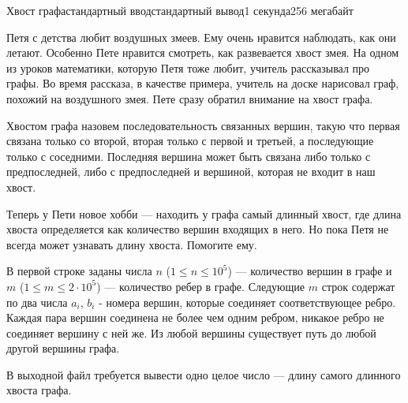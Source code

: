 \begin{problem}{Хвост графа}{стандартный ввод}{стандартный вывод}{1 секунда}{256 мегабайт}

Петя с детства любит воздушных змеев. Ему очень нравится наблюдать, как они летают. Особенно Пете нравится смотреть, как развевается хвост змея. На одном из уроков математики, которую Петя тоже любит, учитель рассказывал про графы. Во время рассказа, в качестве примера, учитель на доске нарисовал граф, похожий на воздушного змея. Пете сразу обратил внимание на хвост графа.

Хвостом графа назовем последовательность связанных вершин, такую что первая связана только со второй, вторая только с первой и третьей, а последующие только с соседними. Последняя вершина может быть связана либо только с предпоследней, либо с предпоследней и вершиной, которая не входит в наш хвост.

Теперь у Пети новое хобби --- находить у графа самый длинный хвост, где длина хвоста определяется как количество вершин входящих в него. Но пока Петя не всегда может узнавать длину хвоста. Помогите ему. 

\InputFile
В первой строке заданы числа $n$ ($1 \le n \le 10^5$) --- количество вершин в графе и $m$ ($1 \le m \le 2 \cdot 10^5$) --- количество ребер в графе. Следующие $m$ строк содержат по два числа $a_i$, $b_i$ - номера вершин, которые соединяет соответствующее ребро. 
Каждая пара вершин соединена не более чем одним ребром, никакое ребро не соединяет вершину с ней же. Из любой вершины существует путь до любой другой вершины графа. 


\OutputFile
В выходной файл требуется вывести одно целое число --- длину самого длинного хвоста графа. 

\Example

\begin{example}
%
\end{example}

\end{problem}

